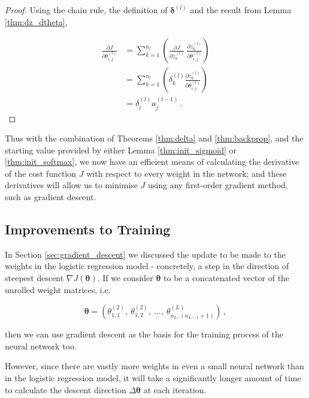 \documentclass{article}[11pt]
\begin{document}
        \begin{proof}
        
            Using the chain rule, the definition of $\boldsymbol{\delta}^{(l)}$ and the result from Lemma \ref{thm:dz_dtheta},
            
            $$ \begin{aligned}
            \frac{\partial J}{\partial \theta^{(l)}_{i,j}}
            &= \sum_{k=1}^{n_l} \left( \frac{\partial J}{\partial z^{(l)}_k} \ \frac{\partial z^{(l)}_k}{\partial \theta^{(l)}_{i,j}} \right) \\
            &= \sum_{k=1}^{n_l} \left( \delta^{(l)}_k \frac{\partial z^{(l)}_k}{\partial \theta^{(l)}_{i,j}} \right) \\
            &= \delta^{(l)}_i a^{(l-1)}_j \,.
            \end{aligned}$$
        
        \end{proof}
        
        
        Thus with the combination of Theorems \ref{thm:delta} and \ref{thm:backprop}, and the starting value provided by either Lemma \ref{thm:init_sigmoid} or \ref{thm:init_softmax}, we now have an efficient means of calculating the derivative of the cost function $J$ with respect to every weight in the network; and these derivatives will allow us to minimise $J$ using any first-order gradient method, such as gradient descent.
        



    \subsection{Improvements to Training}
        
        In Section \ref{sec:gradient_descent} we discussed the update to be made to the weights in the logistic regression model - concretely, a step in the direction of steepest descent $\nabla J(\boldsymbol{\theta})$. If we consider $\boldsymbol{\theta}$ to be a concatenated vector of the unrolled weight matrices, i.e.
        
        $$
        \boldsymbol{\theta} = \left( \theta^{(2)}_{1,1}, \ \theta^{(2)}_{1,2}, \ \ldots, \ \theta^{(L)}_{n_L, (n_{L-1}+1)} \right) \,,
        $$
        
        then we can use gradient descent as the basis for the training process of the neural network too.
        
        However, since there are vastly more weights in even a small neural network than in the logistic regression model, it will take a significantly longer amount of time to calculate the descent direction $\Delta \boldsymbol{\theta}$ at each iteration.
        
\end{document}
